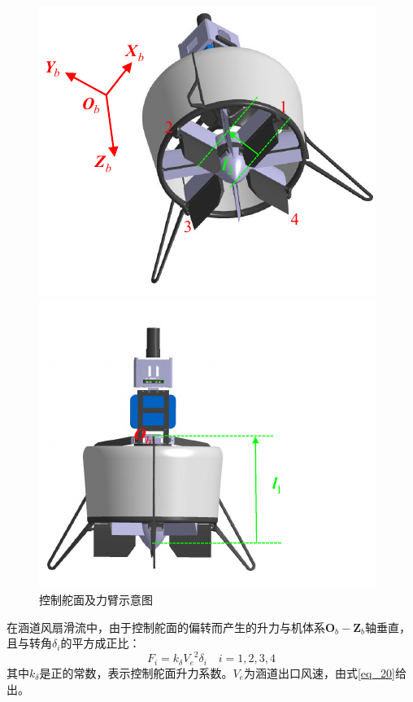 \begin{figure}[htbp]
	\centering
	\begin{minipage}[c]{0.5\textwidth} %
		\centering
		\includegraphics[scale=1]{Fig/控制舵面.pdf}
	\end{minipage}%
	\begin{minipage}[c]{0.5\textwidth}
		\centering
		\includegraphics[scale=1]{Fig/力臂.pdf}
	\end{minipage}
    \caption{\label{控制舵面}控制舵面及力臂示意图}
\end{figure}

在涵道风扇滑流中，由于控制舵面的偏转而产生的升力与机体系${\boldsymbol{O}_b}-{\boldsymbol{Z}_b}$轴垂直，且与转角$\delta_i$的平方成正比\cite{pflimlinModelingAttitudeControl2010a}：
\begin{equation}
    F_i=k_\delta{V_e}^2\delta_i \quad i=1,2,3,4
    \label{eq_35}
\end{equation}
其中$k_\delta$是正的常数，表示控制舵面升力系数。${V_e}$为涵道出口风速，由式\eqref{eq_20}给出。

